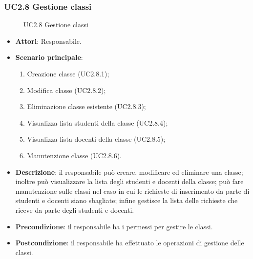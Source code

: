 \subsubsection{UC2.8 Gestione classi}
\begin{figure}[H]
\centering
\noindent{}
\caption{UC2.8 Gestione classi}
\end{figure}
\begin{itemize}
\item \textbf{Attori}: Responsabile.
\item \textbf{Scenario principale}:
\begin{enumerate}
\item Creazione classe (UC2.8.1);
\item Modifica classe (UC2.8.2);
\item Eliminazione classe esistente (UC2.8.3);
\item Visualizza lista studenti della classe (UC2.8.4);
\item Visualizza lista docenti della classe (UC2.8.5);
\item Manutenzione classe (UC2.8.6).
\end{enumerate}
\item \textbf{Descrizione}: il responsabile può creare, modificare ed eliminare una classe; inoltre può visualizzare la lista degli studenti e docenti della classe; può fare manutenzione sulle classi nel caso in cui le richieste di inserimento da parte di studenti e docenti siano sbagliate; infine gestisce la lista delle richieste che riceve da parte degli studenti e docenti.
\item \textbf{Precondizione}: il responsabile ha i permessi per gestire le classi.
\item \textbf{Postcondizione}: il responsabile ha effettuato le operazioni di gestione delle classi.
\end{itemize}
